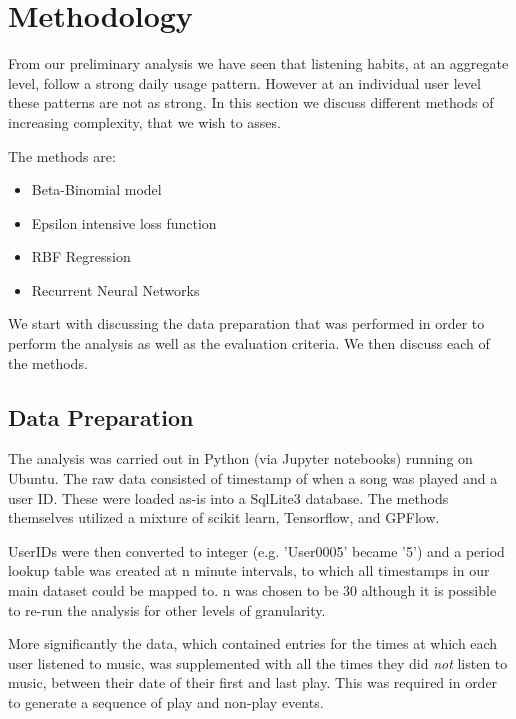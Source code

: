 
\chapter{Methodology} %

\label{Chapter4} %

From our preliminary analysis we have seen that listening habits, at an aggregate level, follow a strong daily usage pattern. However at an individual user level these patterns are not as strong. In this section we discuss different methods of increasing complexity, that we wish to asses.

The methods are:

\begin{itemize}
	\item Beta-Binomial model
	\item Epsilon intensive loss function
	\item RBF Regression
	\item Recurrent Neural Networks
\end{itemize}

We start with discussing the data preparation that was performed in order to perform the analysis as well as the evaluation criteria. We then discuss each of the methods.

\section{Data Preparation}

The analysis was carried out in Python (via Jupyter notebooks) running on Ubuntu. The raw data consisted of timestamp of when a song was played and a user ID. These were loaded as-is into a SqlLite3 database. The methods themselves utilized a mixture of scikit learn, Tensorflow, and GPFlow.

UserIDs were then converted to integer (e.g. 'User0005' became '5') and a period lookup table was created at n minute intervals, to which all timestamps in our main dataset could be mapped to. n was chosen to be 30 although it is possible to re-run the analysis for other levels of granularity.

More significantly the data, which contained entries for the times at which each user listened to music, was supplemented with all the times they did \emph{not} listen to music, between their date of their first and last play. 
This was required in order to generate a sequence of play and non-play events. 

